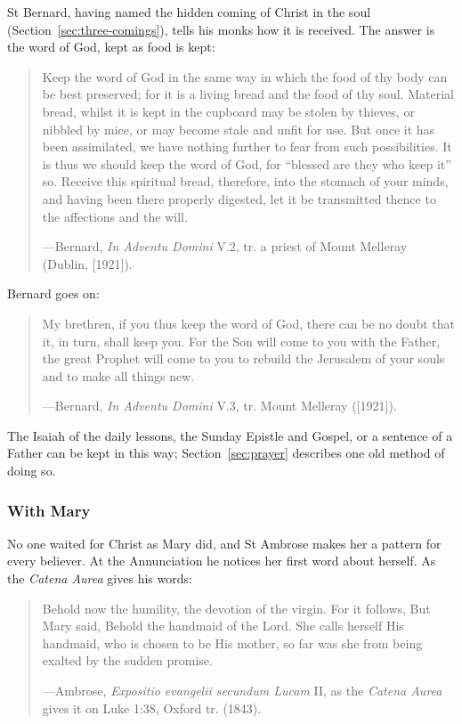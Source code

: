 St Bernard, having named the hidden coming of Christ in the soul (Section~\ref{sec:three-comings}),
tells his monks how it is received. The answer is the word of God, kept as food is kept:

\begin{quote}
Keep the word of God in the same way in which the food of thy body can be best preserved; for it
is a living bread and the food of thy soul. Material bread, whilst it is kept in the cupboard may
be stolen by thieves, or nibbled by mice, or may become stale and unfit for use. But once it has
been assimilated, we have nothing further to fear from such possibilities. It is thus we should
keep the word of God, for ``blessed are they who keep it'' so. Receive this spiritual bread,
therefore, into the stomach of your minds, and having been there properly digested, let it be
transmitted thence to the affections and the will.\par
{\smallskip\noindent\small ---Bernard, \textit{In Adventu Domini} V.2, tr. a priest of Mount
Melleray (Dublin, [1921]).\par}
\end{quote}

\noindent Bernard goes on:

\begin{quote}
My brethren, if you thus keep the word of God, there can be no doubt that it, in turn, shall keep
you. For the Son will come to you with the Father, the great Prophet will come to you to rebuild
the Jerusalem of your souls and to make all things new.\par
{\smallskip\noindent\small ---Bernard, \textit{In Adventu Domini} V.3, tr. Mount Melleray ([1921]).\par}
\end{quote}

\noindent The Isaiah of the daily lessons, the Sunday Epistle and Gospel, or a sentence of a
Father can be kept in this way; Section~\ref{sec:prayer} describes one old method of doing so.

\subsubsection{With Mary}

No one waited for Christ as Mary did, and St Ambrose makes her a pattern for every believer. At
the Annunciation he notices her first word about herself. As the \textit{Catena Aurea} gives
his words:

\begin{quote}
Behold now the humility, the devotion of the virgin. For it follows, But Mary said, Behold the
handmaid of the Lord. She calls herself His handmaid, who is chosen to be His mother, so far was
she from being exalted by the sudden promise.\par
{\smallskip\noindent\small ---Ambrose, \textit{Expositio evangelii secundum Lucam} II, as the
\textit{Catena Aurea} gives it on Luke 1:38, Oxford tr. (1843).\par}
\end{quote}

